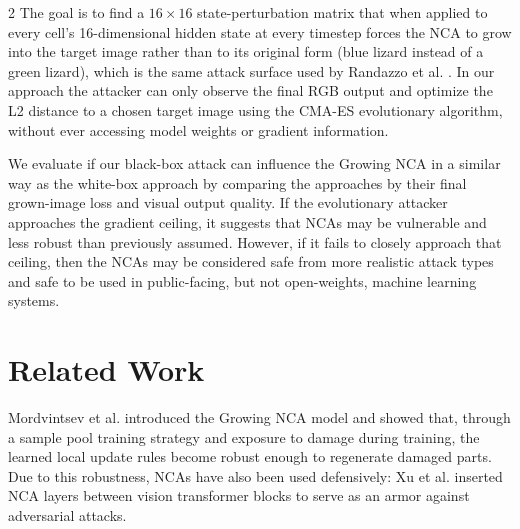 \documentclass{article}
\begin{document}
\begin{multicols}{2}
The goal is to find a $16 \times 16$ state-perturbation matrix that when applied to every cell's 16-dimensional hidden state at every timestep forces the NCA to grow into the target image rather than to its original form (blue lizard instead of a green lizard), which is the same attack surface used by Randazzo et al. \cite{randazzo2021adversarial}. 
In our approach the attacker can only observe the final RGB output and optimize the L2 distance to a chosen target image using the CMA-ES evolutionary algorithm, without ever accessing model weights or gradient information.  


We evaluate if our black-box attack can influence the Growing NCA in a similar way as the white-box approach by comparing the approaches by their final grown-image loss and visual output quality. If the evolutionary attacker approaches the gradient ceiling, it suggests that NCAs may be vulnerable and less robust than previously assumed. However, if it fails to closely approach that ceiling, then the NCAs may be considered safe from more realistic attack types and safe to be used in public-facing, but not open-weights, machine learning systems. 



\section*{Related Work}
Mordvintsev et al. \cite{mordvintsev2020growing} introduced the Growing NCA model and showed that, through a sample pool training strategy and exposure to damage during training, the learned local update rules become robust enough to regenerate damaged parts. Due to this robustness, NCAs have also been used defensively: Xu et al. \cite{xu2024adanca} inserted NCA layers between vision transformer blocks to serve as an armor against adversarial attacks.


\end{multicols}
\end{document}
